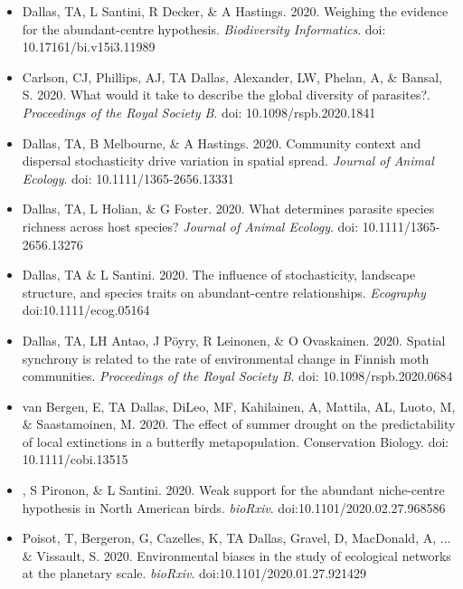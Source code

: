 \documentclass[]{CV}
\begin{document}
{}

\begin{itemize}

\item {\mefont Dallas, TA}, L Santini, R Decker, \& A Hastings. 2020. Weighing the evidence for the abundant-centre hypothesis. \textit{Biodiversity Informatics}. doi: 10.17161/bi.v15i3.11989 

\item Carlson, CJ, Phillips, AJ, {\mefont TA Dallas}, Alexander, LW, Phelan, A, \& Bansal, S. 2020. What would it take to describe the global diversity of parasites?. \textit{Proceedings of the Royal Society B}. doi: 10.1098/rspb.2020.1841

\item {\mefont Dallas, TA}, B Melbourne, \& A Hastings. 2020. Community context and dispersal stochasticity drive variation in spatial spread. \textit{Journal of Animal Ecology}. doi: 10.1111/1365-2656.13331

\item {\mefont Dallas, TA}, L Holian, \& G Foster. 2020. What determines parasite species richness across host species? \textit{Journal of Animal Ecology}. doi: 10.1111/1365-2656.13276

\item {\mefont Dallas, TA} \& L Santini. 2020. The influence of stochasticity, landscape structure, and species traits on abundant-centre relationships. \textit{Ecography} doi:10.1111/ecog.05164

\item {\mefont Dallas, TA}, LH Antao, J Pöyry, R Leinonen, \& O Ovaskainen. 2020. Spatial synchrony is related to the rate of environmental change in Finnish moth communities. \textit{Proceedings of the Royal Society B}. doi: 10.1098/rspb.2020.0684

\item van Bergen, E, {\mefont TA Dallas}, DiLeo, MF, Kahilainen, A, Mattila, AL, Luoto, M, \& Saastamoinen, M. 2020. The effect of summer drought on the predictability of local extinctions in a butterfly metapopulation. Conservation Biology. doi: 10.1111/cobi.13515

\item {}, S Pironon, \& L Santini. 2020. Weak support for the abundant niche-centre hypothesis in North American birds. \textit{bioRxiv}. doi:10.1101/2020.02.27.968586

\item \OA Poisot, T, Bergeron, G, Cazelles, K, {\mefont TA Dallas}, Gravel, D, MacDonald, A, ... \& Vissault, S. 2020. Environmental biases in the study of ecological networks at the planetary scale. \textit{bioRxiv}. doi:10.1101/2020.01.27.921429

\end{itemize}
\end{document}
